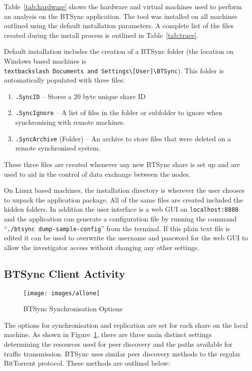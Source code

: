 \documentclass[final,5p,times,twocolumn]{elsarticle}
\begin{document}
Table~\ref{tab:hardware} shows the hardware and virtual machines used to perform an analysis on the BTSync application. The tool was installed on all machines outlined using the default installation parameters. A complete list of the files created during the install process is outlined in Table~\ref{tab:trace}.


Default installation includes the creation of a BTSync folder (the location on Windows based machines is \texttt{\\textbackslash Documents and Settings\textbackslash [User]\textbackslash BTSync}). This folder is automatically populated with three files:
\begin{enumerate}
\item \texttt{.SyncID} -- Stores a 20 byte unique share ID
\item \texttt{.SyncIgnore} -- A list of files in the folder or subfolder to ignore when synchronising with remote machines.
\item \texttt{.SyncArchive} (Folder) -- An archive to store files that were deleted on a remote synchronised system.
\end{enumerate}
These three files are created whenever any new BTSync share is set up and are used to aid in the control of data exchange between the nodes.

On Linux based machines, the installation directory is wherever the user chooses to unpack the application package. All of the same files are created included the hidden folders. In addition the user interface is a web GUI on \texttt{localhost:8888} and the application can generate a configuration file by running the command ``\texttt{./btsync dump-sample-config}'' from the terminal. If this plain text file is edited it can be used to overwrite the username and password for the web GUI to allow the investigator access without changing any other settings.

\subsection{BTSync Client Activity}
\label{BTSyncClient}

\begin{figure}[!h]
\centering
\texttt{[image: images/allone]}
\caption{BTSync Synchronisation Options}
\label{fig:syncopts}
\end{figure}

The options for synchronisation and replication are set for each share on the local machine. As shown in Figure~\ref{fig:syncopts}, there are three main distinct settings determining the resources used for peer discovery and the paths available for traffic transmission. BTSync uses similar peer discovery methods to the regular BitTorrent protocol. These methods are outlined below:
\end{document}
